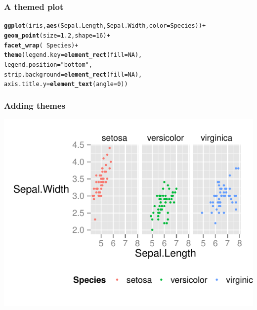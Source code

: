 \documentclass{beamer}\usepackage[]{graphicx}\usepackage[]{color}
\makeatletter
\newcommand{\hlnum}[1]{\textcolor[rgb]{0.686,0.059,0.569}{#1}}%
\newcommand{\hlstr}[1]{\textcolor[rgb]{0.192,0.494,0.8}{#1}}%
\newcommand{\hlopt}[1]{\textcolor[rgb]{0,0,0}{#1}}%
\newcommand{\hlstd}[1]{\textcolor[rgb]{0.345,0.345,0.345}{#1}}%
\newcommand{\hlkwc}[1]{\textcolor[rgb]{0.333,0.667,0.333}{#1}}%
\newcommand{\hlkwd}[1]{\textcolor[rgb]{0.737,0.353,0.396}{\textbf{#1}}}%
\newenvironment{kframe}{%
 \def\at@end@of@kframe{}%
 \ifinner\ifhmode%
  \def\at@end@of@kframe{\end{minipage}}%
  \begin{minipage}{\columnwidth}%
 \fi\fi%
 \def\FrameCommand##1{\hskip\@totalleftmargin \hskip-\fboxsep
 \colorbox{shadecolor}{##1}\hskip-\fboxsep
     \hskip-\linewidth \hskip-\@totalleftmargin \hskip\columnwidth}%
 \MakeFramed {\advance\hsize-\width
   \@totalleftmargin\z@ \linewidth\hsize
   \@setminipage}}%
 {\par\unskip\endMakeFramed%
 \at@end@of@kframe}
\newenvironment{knitrout}{}{} %
\makeatother
\begin{document}

\begin{frame}[fragile]
\frametitle{A themed plot}
\begin{knitrout}\footnotesize
{}\color{fgcolor}\begin{kframe}
\begin{alltt}
\hlkwd{ggplot}\hlstd{(iris,} \hlkwd{aes}\hlstd{(Sepal.Length, Sepal.Width,} \hlkwc{color} \hlstd{= Species))} \hlopt{+}
\hlkwd{geom_point}\hlstd{(}\hlkwc{size} \hlstd{=} \hlnum{1.2}\hlstd{,} \hlkwc{shape} \hlstd{=} \hlnum{16}\hlstd{)} \hlopt{+}
\hlkwd{facet_wrap}\hlstd{(} \hlopt{~} \hlstd{Species)} \hlopt{+}
\hlkwd{theme}\hlstd{(}\hlkwc{legend.key} \hlstd{=} \hlkwd{element_rect}\hlstd{(}\hlkwc{fill} \hlstd{=} \hlnum{NA}\hlstd{),}
\hlkwc{legend.position} \hlstd{=} \hlstr{"bottom"}\hlstd{,}
\hlkwc{strip.background} \hlstd{=} \hlkwd{element_rect}\hlstd{(}\hlkwc{fill} \hlstd{=} \hlnum{NA}\hlstd{),}
\hlkwc{axis.title.y} \hlstd{=} \hlkwd{element_text}\hlstd{(}\hlkwc{angle} \hlstd{=} \hlnum{0}\hlstd{))}
\end{alltt}
\end{kframe}
\end{knitrout}

\end{frame}


\begin{frame}[fragile]
\frametitle{Adding themes}
\begin{knitrout}\footnotesize
{}\color{fgcolor}
\includegraphics[width=.75\linewidth]{figure/facet_wrap_theme_execc} 

\end{knitrout}

\end{frame}
\end{document}
